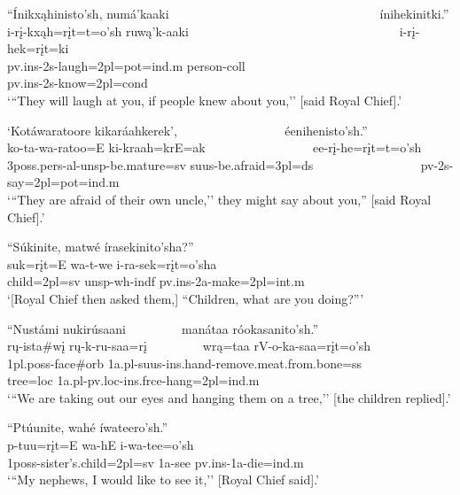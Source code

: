 \begin{exe}
\item\label{EJ10} \glll ``Ínikxąhinisto'sh, numá'kaaki ~ ~ ~ ~ ~ ~ ~ ~ ~ ~ ~ ~ ~ ~ ~ ~ ~ ~ ~ ~ ínihekinitki.''\\
i-rį-kxąh=rįt=t=o'sh ruwą'k-aaki ~ ~ ~ ~ ~ ~ ~ ~ ~ ~ ~ ~ ~ ~ ~ ~ ~ ~ ~ ~ i-rį-hek=rįt=ki\\
pv.ins-2s-\textnormal{laugh}=2pl=pot=ind.m \textnormal{person}-coll ~ ~ ~ ~ ~ ~ ~ ~ ~ ~ ~ ~ ~ ~ ~ ~ ~ ~ ~ ~ pv.ins-2s-\textnormal{know}=2pl=cond\\
\glt `{``}They will laugh at you, if people knew about you,'' [said Royal Chief].'

\item\label{EJ11} `Kotáwaratoore kikaráahkerek', ~ ~ ~ ~ ~ ~ ~ ~ ~ ~ éenihenisto'sh.''\\
ko-ta-wa-ratoo=E ki-kraah=krE=ak ~ ~ ~ ~ ~ ~ ~ ~ ~ ~ ee-rį-he=rįt=t=o'sh\\
3poss.pers-al-unsp-\textnormal{be.mature}=sv suus-\textnormal{be.afraid}=3pl=ds ~ ~ ~ ~ ~ ~ ~ ~ ~ ~ pv-2s-\textnormal{say}=2pl=pot=ind.m\\
\glt `{``}They are afraid of their own uncle,'' they might say about you,{''} [said Royal Chief].'

\item\label{EJ12} \glll ``Súkinite, matwé írasekinito'sha?''\\
suk=rįt=E wa-t-we i-ra-sek=rįt=o'sha\\
\textnormal{child}=2pl=sv unsp-wh-indf pv.ins-2a-\textnormal{make}=2pl=int.m\\
\glt `[Royal Chief then asked them,] ``Children, what are you doing?{''}'

\item\label{EJ13} \glll ``Nustámi nukirúsaani ~ ~ ~ ~ ~ manátaa róokasanito'sh.''\\
rų-ista\#wį rų-k-ru-saa=rį ~ ~ ~ ~ ~ wrą=taa rV-o-ka-saa=rįt=o'sh\\
1pl.poss-\textnormal{face}\#\textnormal{orb} 1a.pl-suus-ins.hand-\textnormal{remove.meat.from.bone}=ss ~ ~ ~ ~ ~ \textnormal{tree}=loc 1a.pl-pv.loc-ins.frce-\textnormal{hang}=2pl=ind.m\\
\glt `{``}We are taking out our eyes and hanging them on a tree,'' [the children replied].'


\item\label{EJ14} \glll ``Ptúunite, wahé íwateero'sh.''\\
p-tuu=rįt=E wa-hE i-wa-tee=o'sh\\
1poss-\textnormal{sister's.child}=2pl=sv 1a-\textnormal{see} pv.ins-1a-\textnormal{die}=ind.m\\
\glt `{``}My nephews, I would like to see it,'' [Royal Chief said].'


\end{exe}
